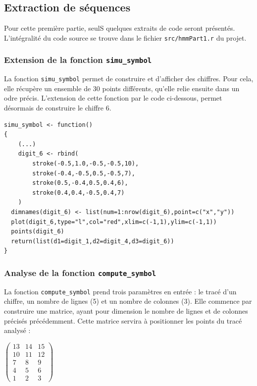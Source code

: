 \subsection{Extraction de séquences}

Pour cette première partie, seulS quelques extraits de code seront présentés. L'intégralité du code source se trouve dans le fichier \texttt{src/hmmPart1.r} du projet. 

\subsubsection*{Extension de la fonction \texttt{simu\_symbol}}

La fonction \texttt{simu\_symbol} permet de construire et d'afficher des chiffres. Pour cela, elle récupère un ensemble de 30 points différents, qu'elle relie ensuite dans un odre précis. L'extension de cette fonction par le code ci-dessous, permet désormais de construire le chiffre 6.

\begin{lstlisting}
simu_symbol <- function()
{
	(...)
	digit_6 <- rbind(
		stroke(-0.5,1.0,-0.5,-0.5,10),
		stroke(-0.4,-0.5,0.5,-0.5,7),
		stroke(0.5,-0.4,0.5,0.4,6),
		stroke(0.4,0.4,-0.5,0.4,7)
	)
  dimnames(digit_6) <- list(num=1:nrow(digit_6),point=c("x","y"))
  plot(digit_6,type="l",col="red",xlim=c(-1,1),ylim=c(-1,1))
  points(digit_6)
  return(list(d1=digit_1,d2=digit_4,d3=digit_6))
}
\end{lstlisting}

\subsubsection*{Analyse de la fonction \texttt{compute\_symbol}}
La fonction \texttt{compute\_symbol} prend trois paramètres en entrée : le tracé d'un chiffre, un nombre de lignes (5) et un nombre de colonnes (3). Elle commence par construire une matrice, ayant pour dimension le nombre de lignes et de colonnes précisés précédemment. Cette matrice servira à positionner les points du tracé analysé :
\begin{center}
	$\begin{pmatrix}
		13 & 14 & 15 \\
		10 & 11 & 12 \\
		7 & 8 & 9 \\
		4 & 5 & 6 \\
		1 & 2 & 3
	\end{pmatrix}$
\end{center}

